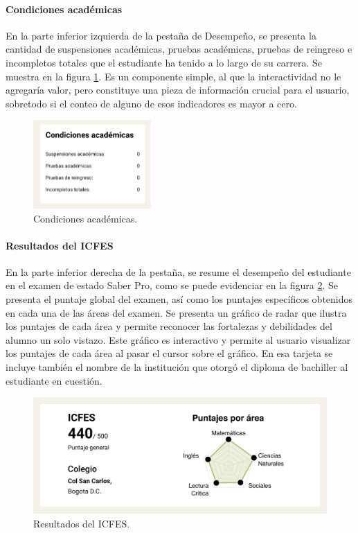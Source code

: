 \paragraph{Condiciones académicas} En la parte inferior izquierda de la pestaña de Desempeño, se presenta la cantidad de suspensiones académicas, pruebas académicas, pruebas de reingreso e incompletos totales que el estudiante ha tenido a lo largo de su carrera. Se muestra en la figura \ref{fig:condiciones_academicas}. Es un componente simple, al que la interactividad no le agregaría valor, pero constituye una pieza de información crucial para el usuario, sobretodo si el conteo de alguno de esos indicadores es mayor a cero.

\begin{figure}[H]
	\centering
	\includegraphics[width=0.4\textwidth]{assets/nes/condiciones_academicas.png}
	\caption{Condiciones académicas.}
	\label{fig:condiciones_academicas}
\end{figure}

\paragraph{Resultados del ICFES} En la parte inferior derecha de la pestaña, se resume el desempeño del estudiante en el examen de estado Saber Pro, como se puede evidenciar en la figura \ref{fig:icfes}. Se presenta el puntaje global del examen, así como los puntajes específicos obtenidos en cada una de las áreas del examen. Se presenta un gráfico de radar que ilustra los puntajes de cada área y permite reconocer las fortalezas y debilidades del alumno un solo vistazo. Este gráfico es interactivo y permite al usuario visualizar los puntajes de cada área al pasar el cursor sobre el gráfico. En esa tarjeta se incluye también el nombre de la institución que otorgó el diploma de bachiller al estudiante en cuestión.

\begin{figure}[H]
	\includegraphics[width=\textwidth]{assets/nes/icfes.png}
	\caption{Resultados del ICFES.}
	\label{fig:icfes}
\end{figure}

